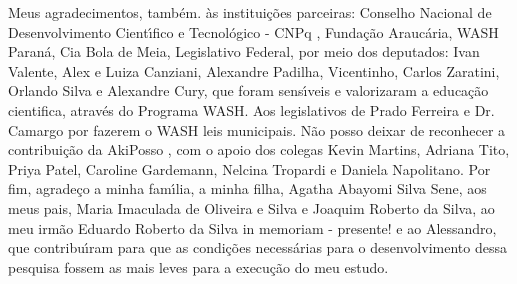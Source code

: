 \begin{agradecimentos}
Meus agradecimentos, tamb\'em. \`as institui\c{c}\~oes parceiras: Conselho Nacional de Desenvolvimento Cient\'{\i}fico e Tecnol\'ogico - CNPq , Funda\c{c}\~ao Arauc\'aria, WASH Paran\'a, Cia Bola de Meia, Legislativo Federal, por meio dos deputados: Ivan Valente, Alex e Luiza Canziani, Alexandre Padilha, Vicentinho, Carlos Zaratini, Orlando Silva e Alexandre Cury, que foram sens\'{\i}veis e valorizaram a educa\c{c}\~ao cientifica, atrav\'es do Programa WASH. Aos legislativos de Prado Ferreira e Dr. Camargo por fazerem o WASH leis municipais. N\~ao posso deixar de reconhecer a contribui\c{c}\~ao da AkiPosso , com o apoio dos colegas Kevin Martins, Adriana Tito, Priya Patel, Caroline Gardemann, Nelcina Tropardi e Daniela Napolitano. Por fim, agrade\c{c}o a minha fam\'{\i}lia, a minha filha, Agatha Abayomi Silva Sene, aos meus pais, Maria Imaculada de Oliveira e Silva e Joaquim Roberto da Silva, ao meu irm\~ao Eduardo Roberto da Silva in memoriam - presente! e ao Alessandro, que contribu\'{\i}ram para que as condi\c{c}\~oes necess\'arias para o desenvolvimento dessa pesquisa fossem as mais leves para a execu\c{c}\~ao do meu estudo.

\end{agradecimentos}
